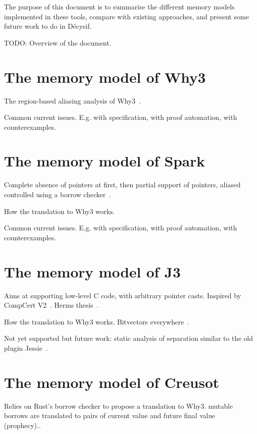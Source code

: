 \documentclass[a4paper,twoside]{article}
\begin{document}
The purpose of this document is to summarise the different memory models
implemented in these tools, compare with existing approaches, and present some
future work to do in Décysif.


TODO: Overview of the document.

\section{The memory model of Why3}

The region-based aliasing analysis of Why3~\cite{gondelman16reg}.

Common current issues. E.g. with specification, with proof automation, with
counterexamples.

\section{The memory model of Spark}

Complete absence of pointers at first, then partial support of pointers, aliased
controlled using a borrow checker~\cite{dross20cav,jaloyan20icfem}.

How the translation to Why3 works.

Common current issues. E.g. with specification, with proof automation, with
counterexamples.

\section{The memory model of J3}

Aims at supporting low-level C code, with arbitrary pointer casts. Inspired by
CompCert V2~\cite{leroy12rr}. Herms thesis~\cite{herms13phd}.

How the translation to Why3 works. Bitvectors everywhere~\cite{fumex16nfm}.

Not yet supported but future work: static analysis
of separation similar to the old plugin
Jessie~\cite{hubert2008these,hubert07hav}.


\section{The memory model of Creusot}

Relies on Rust's borrow checker to propose a translation to Why3. mutable
borrows are translated to pairs of current value and future final value
(prophecy).\cite{denis23phd,denis22icfem,matsushita22pldi}.
\end{document}
